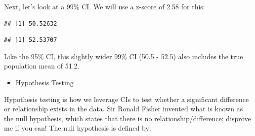 \documentclass[]{book}
\newenvironment{Shaded}{\begin{snugshade}}{\end{snugshade}}
\newcommand{\CommentTok}[1]{\textcolor[rgb]{0.56,0.35,0.01}{\textit{#1}}}
\newcommand{\FloatTok}[1]{\textcolor[rgb]{0.00,0.00,0.81}{#1}}
\newcommand{\KeywordTok}[1]{\textcolor[rgb]{0.13,0.29,0.53}{\textbf{#1}}}
\newcommand{\NormalTok}[1]{#1}
\newcommand{\OperatorTok}[1]{\textcolor[rgb]{0.81,0.36,0.00}{\textbf{#1}}}
\newcommand{\StringTok}[1]{\textcolor[rgb]{0.31,0.60,0.02}{#1}}
\providecommand{\tightlist}{%
  \setlength{\itemsep}{0pt}\setlength{\parskip}{0pt}}
\begin{document}
Next, let's look at a 99\% CI. We will use a z-score of 2.58 for this:

\begin{Shaded}
\end{Shaded}

\begin{Shaded}
\end{Shaded}

\begin{verbatim}
## [1] 50.52632
\end{verbatim}

\begin{Shaded}
\end{Shaded}

\begin{verbatim}
## [1] 52.53707
\end{verbatim}

Like the 95\% CI, this slightly wider 99\% CI (50.5 - 52.5) also includes the true population mean of 51.2.

\begin{itemize}
\tightlist
\item
  Hypothesis Testing
\end{itemize}

Hypothesis testing is how we leverage CIs to test whether a significant difference or relationship exists in the data. Sir Ronald Fisher invented what is known as the null hypothesis, which states that there is no relationship/difference; disprove me if you can! The null hypothesis is defined by:
\end{document}
